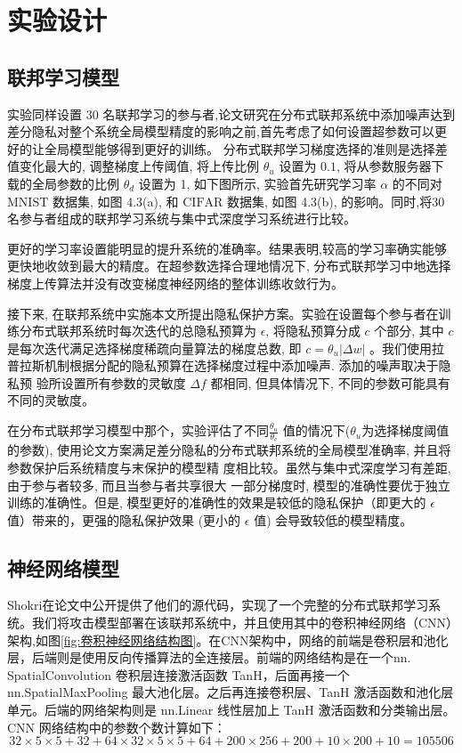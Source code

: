 \section{实验设计}
\subsection{联邦学习模型}
实验同样设置 30 名联邦学习的参与者,论文研究在分布式联邦系统中添加噪声达到差分隐私对整个系统全局模型精度的影响之前,首先考虑了如何设置超参数可以更好的让全局模型能够得到更好的训练。
分布式联邦学习梯度选择的准则是选择差值变化最大的, 调整梯度上传阈值, 将上传比例 $\theta_{u}$ 设置为 $0.1$, 将从参数服务器下载的全局参数的比例 $\theta_{d}$ 设置为 1, 如下图所示, 实验首先研究学习率 $\alpha$ 的不同对 $\mathrm{MNIST}$ 数据集, 如图 4.3(a), 和 $\mathrm{CIFAR}$ 数据集, 如图 4.3(b), 的影响。同时,将30名参与者组成的联邦学习系统与集中式深度学习系统进行比较。

更好的学习率设置能明显的提升系统的准确率。结果表明,较高的学习率确实能够更快地收敛到最大的精度。在超参数选择合理地情况下, 分布式联邦学习中地选择梯度上传算法并没有改变梯度神经网络的整体训练收敛行为。

接下来, 在联邦系统中实施本文所提出隐私保护方案。实验在设置每个参与者在训练分布式联邦系统时每次迭代的总隐私预算为 $\epsilon$, 将隐私预算分成 $c$ 个部分, 其中 $c$ 是每次迭代满足选择梯度稀疏向量算法的梯度总数, 即 $c=\theta_{u}|\Delta w|$ 。我们使用拉普拉斯机制根据分配的隐私预算在选择梯度过程中添加噪声. 添加的噪声取决于隐私预 验所设置所有参数的灵敏度 $\Delta f$ 都相同, 但具体情况下, 不同的参数可能具有不同的灵敏度。 

在分布式联邦学习模型中那个，实验评估了不同$\frac{\theta_{u}}{\theta_{c}}$ 值的情况下($\theta_{u}$为选择梯度阈值的参数), 使用论文方案满足差分隐私的分布式联邦系统的全局模型准确率, 并且将参数保护后系统精度与末保护的模型精 度相比较。虽然与集中式深度学习有差距, 由于参与者较多, 而且当参与者共享很大 一部分梯度时, 模型的准确性要优于独立训练的准确性。但是, 模型更好的准确性的效果是较低的隐私保护（即更大的 $\epsilon$ 值）带来的，更强的隐私保护效果 (更小的 $\epsilon$ 值) 会导致较低的模型精度。

\subsection{神经网络模型}
Shokri\cite{ref51}在论文中公开提供了他们的源代码，实现了一个完整的分布式联邦学习系统。我们将攻击模型部署在该联邦系统中，并且使用其中的卷积神经网络（CNN）架构,如图\ref{fig:卷积神经网络结构图}。在CNN架构中，网络的前端是卷积层和池化层，后端则是使用反向传播算法的全连接层。前端的网络结构是在一个nn. SpatialConvolution 卷积层连接激活函数 TanH，后面再接一个 nn.SpatialMaxPooling 最大池化层。之后再连接卷积层、TanH 激活函数和池化层单元。后端的网络架构则是 nn.Linear 线性层加上 TanH 激活函数和分类输出层。CNN 网络结构中的参数个数计算如下：
$$
32×5×5 + 32 + 64×32×5×5 + 64 + 200×256 + 200 + 10×200 + 10 = 105506
$$

